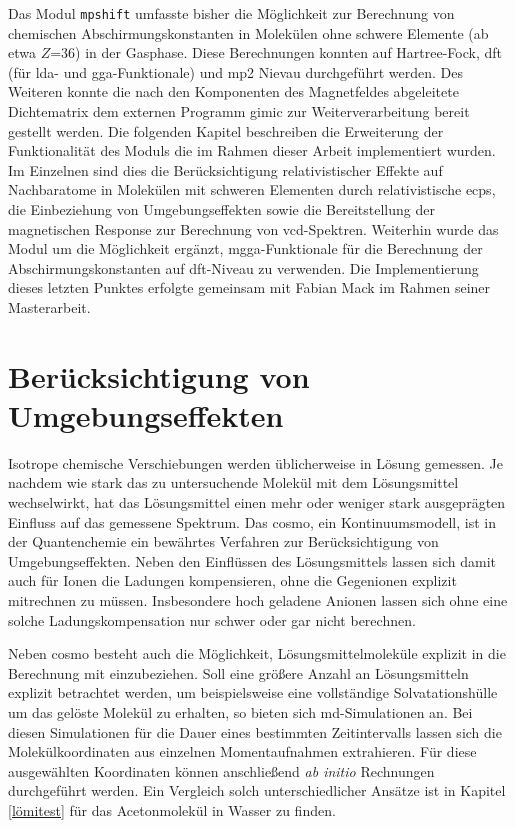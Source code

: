 Das Modul \texttt{mpshift} umfasste bisher die Möglichkeit zur Berechnung von chemischen Abschirmungskonstanten in Molekülen ohne schwere Elemente (ab etwa $Z$=36) in der Gasphase. Diese Berechnungen konnten auf Hartree-Fock, \ac{dft} (für \ac{lda}- und \ac{gga}-Funktionale) und \ac{mp2} Nievau durchgeführt werden. Des Weiteren konnte die nach den Komponenten des Magnetfeldes abgeleitete Dichtematrix dem externen Programm \ac{gimic} zur Weiterverarbeitung bereit gestellt werden. Die folgenden Kapitel beschreiben die Erweiterung der Funktionalität des Moduls die im Rahmen dieser Arbeit implementiert wurden. Im Einzelnen sind dies die Berücksichtigung relativistischer Effekte auf Nachbaratome in Molekülen mit schweren Elementen durch relativistische \acp{ecp}, die Einbeziehung von Umgebungseffekten sowie die Bereitstellung der magnetischen Response zur Berechnung von \ac{vcd}-Spektren. Weiterhin wurde das Modul um die Möglichkeit ergänzt, \ac{mgga}-Funktionale für die Berechnung der Abschirmungskonstanten auf \ac{dft}-Niveau zu verwenden. Die Implementierung dieses letzten Punktes erfolgte gemeinsam mit Fabian Mack im Rahmen seiner Masterarbeit.\supercite{mack2017} 


\section{Berücksichtigung von Umgebungseffekten}\label{umgebung}
Isotrope chemische Verschiebungen werden üblicherweise in Lösung gemessen. Je nachdem wie stark das zu untersuchende Molekül mit dem Lösungsmittel wechselwirkt, hat das Lösungsmittel einen mehr oder weniger stark ausgeprägten Einfluss auf das gemessene Spektrum. Das \acf{cosmo}\supercite{klamt1993cosmo}, ein Kontinuumsmodell, ist in der Quantenchemie ein bewährtes Verfahren zur Berücksichtigung von Umgebungseffekten. Neben den Einflüssen des Lösungsmittels lassen sich damit auch für Ionen die Ladungen kompensieren, ohne die Gegenionen explizit mitrechnen zu müssen. Insbesondere hoch geladene Anionen lassen sich ohne eine solche Ladungskompensation nur schwer oder gar nicht berechnen. 

Neben \ac{cosmo} besteht auch die Möglichkeit, Lösungsmittelmoleküle explizit in die Berechnung mit einzubeziehen. Soll eine größere Anzahl an Lösungsmitteln explizit betrachtet werden, um beispielsweise eine vollständige Solvatationshülle um das gelöste Molekül zu erhalten, so bieten sich \ac{md}-Simulationen an. Bei diesen Simulationen für die Dauer eines bestimmten Zeitintervalls lassen sich die Molekülkoordinaten aus einzelnen Momentaufnahmen extrahieren. Für diese ausgewählten Koordinaten können anschließend \textit{ab initio} Rechnungen durchgeführt werden. Ein Vergleich solch unterschiedlicher Ansätze ist in Kapitel \ref{lömitest} für das Acetonmolekül in Wasser zu finden. 


